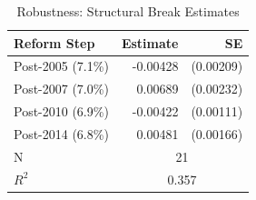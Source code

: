 \begin{table}[htbp]
\centering
\caption{Robustness: Structural Break Estimates}
\label{tab:robustness}
\begin{tabular}{lrr}
\toprule
Reform Step & Estimate & SE \\
\midrule
Post-2005 (7.1\%) & -0.00428 & (0.00209) \\
Post-2007 (7.0\%) & 0.00689 & (0.00232) \\
Post-2010 (6.9\%) & -0.00422 & (0.00111) \\
Post-2014 (6.8\%) & 0.00481 & (0.00166) \\
\midrule
N & \multicolumn{2}{c}{21} \\
$R^2$ & \multicolumn{2}{c}{0.357} \\
\bottomrule
\end{tabular}

\par{}

\end{table}

